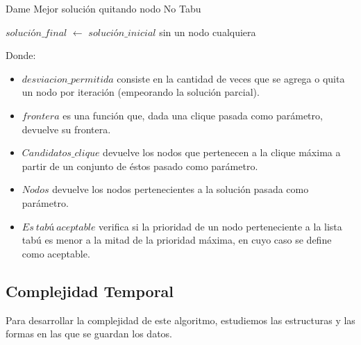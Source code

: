 \begin{algorithm}[H]
    \SetAlgoLined
    \caption{Dame Mejor solución quitando nodo No Tabu}

	$solución\_final$ $\leftarrow$ $solución\_inicial$ sin un nodo cualquiera \\

\end{algorithm}

Donde:
\begin{itemize}
 \item $desviacion\_permitida$ consiste en la cantidad de veces que se agrega o quita un nodo por iteración (empeorando la solución parcial).
 \item $frontera$ es una función que, dada una clique pasada como parámetro, devuelve su frontera.
 \item $Candidatos\_clique$ devuelve los nodos que pertenecen a la clique máxima a partir de un conjunto de éstos pasado como parámetro.
 \item $Nodos$ devuelve los nodos pertenecientes a la solución pasada como parámetro.
 \item $Es\ tabú\ aceptable$ verifica si la prioridad de un nodo perteneciente a la lista tabú es menor a la mitad de la prioridad máxima, en cuyo caso se define como aceptable.
\end{itemize}

\subsection{Complejidad Temporal}

 Para desarrollar la complejidad de este algoritmo, estudiemos las estructuras y las formas en las que se guardan los datos. \newline

